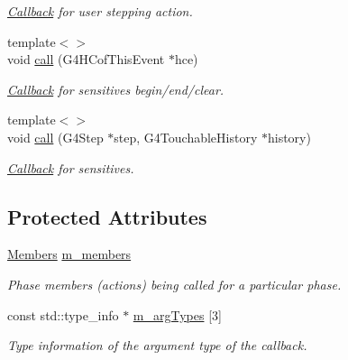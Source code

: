 \begin{DoxyCompactItemize}
\begin{DoxyCompactList}\small\item\em \hyperlink{class_d_d4hep_1_1_callback}{Callback} for user stepping action. \end{DoxyCompactList}\item 
{\footnotesize template$<$$>$ }\\void \hyperlink{class_d_d4hep_1_1_simulation_1_1_geant4_action_phase_a3d3f9aa23aa2979499de53fc84a6a38b}{call} (G4\+H\+Cof\+This\+Event $\ast$hce)
\begin{DoxyCompactList}\small\item\em \hyperlink{class_d_d4hep_1_1_callback}{Callback} for sensitives begin/end/clear. \end{DoxyCompactList}\item 
{\footnotesize template$<$$>$ }\\void \hyperlink{class_d_d4hep_1_1_simulation_1_1_geant4_action_phase_a72d099369f54e89a9d95199bcc5df4e7}{call} (G4\+Step $\ast$step, G4\+Touchable\+History $\ast$history)
\begin{DoxyCompactList}\small\item\em \hyperlink{class_d_d4hep_1_1_callback}{Callback} for sensitives. \end{DoxyCompactList}\end{DoxyCompactItemize}
\subsection*{Protected Attributes}
\begin{DoxyCompactItemize}
\item 
\hyperlink{class_d_d4hep_1_1_simulation_1_1_geant4_action_phase_a4df9a501a5c2d810603cd58f5ff5157d}{Members} \hyperlink{class_d_d4hep_1_1_simulation_1_1_geant4_action_phase_a24b9ef3a3dbb361f17a5e2600dc6f57d}{m\+\_\+members}
\begin{DoxyCompactList}\small\item\em Phase members (actions) being called for a particular phase. \end{DoxyCompactList}\item 
const std\+::type\+\_\+info $\ast$ \hyperlink{class_d_d4hep_1_1_simulation_1_1_geant4_action_phase_a92e33c1a9f3cdbd49cf3b31a61213f57}{m\+\_\+arg\+Types} \mbox{[}3\mbox{]}
\begin{DoxyCompactList}\small\item\em Type information of the argument type of the callback. \end{DoxyCompactList}\end{DoxyCompactItemize}
